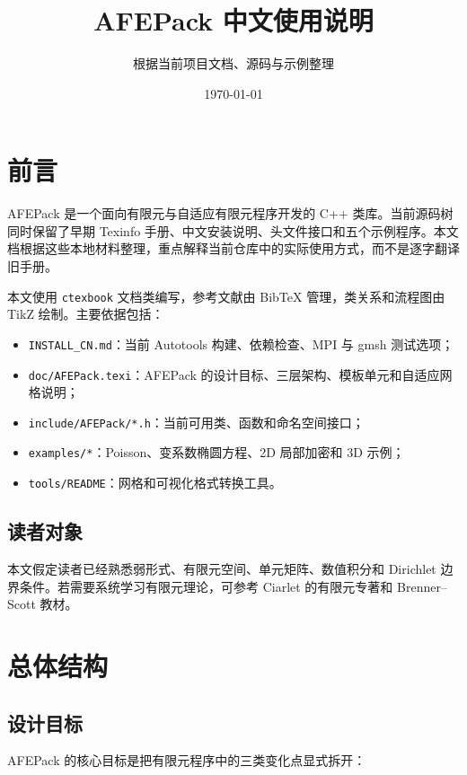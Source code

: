 \documentclass[UTF8,openany,zihao=-4,scheme=chinese]{ctexbook}
\title{AFEPack 中文使用说明}
\author{根据当前项目文档、源码与示例整理}
\date{\today}
\newcommand{\file}[1]{\nolinkurl{#1}}
\newcommand{\class}[1]{\texttt{#1}}
\begin{document}
\frontmatter
\maketitle
\tableofcontents

\chapter{前言}

AFEPack 是一个面向有限元与自适应有限元程序开发的 C++ 类库。当前源码树同时保留了早期 Texinfo 手册、中文安装说明、头文件接口和五个示例程序\cite{afepack-source}。本文档根据这些本地材料整理，重点解释当前仓库中的实际使用方式，而不是逐字翻译旧手册。

本文使用 \class{ctexbook} 文档类编写，参考文献由 BibTeX 管理，类关系和流程图由 TikZ 绘制。主要依据包括：

\begin{itemize}[leftmargin=2em]
  \item \file{INSTALL_CN.md}：当前 Autotools 构建、依赖检查、MPI 与 gmsh 测试选项；
  \item \file{doc/AFEPack.texi}：AFEPack 的设计目标、三层架构、模板单元和自适应网格说明；
  \item \file{include/AFEPack/*.h}：当前可用类、函数和命名空间接口；
  \item \file{examples/*}：Poisson、变系数椭圆方程、2D 局部加密和 3D 示例；
  \item \file{tools/README}：网格和可视化格式转换工具。
\end{itemize}

\section*{读者对象}

本文假定读者已经熟悉弱形式、有限元空间、单元矩阵、数值积分和 Dirichlet 边界条件。若需要系统学习有限元理论，可参考 Ciarlet 的有限元专著和 Brenner--Scott 教材\cite{ciarlet1978fem,brenner2008mathematical}。

\mainmatter

\chapter{总体结构}

\section{设计目标}

AFEPack 的核心目标是把有限元程序中的三类变化点显式拆开：
\end{document}
